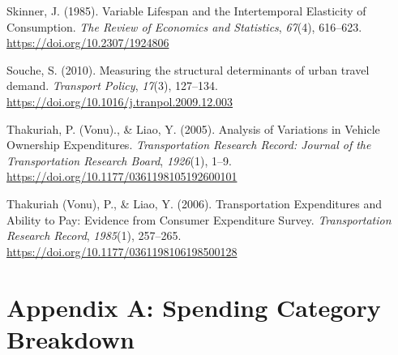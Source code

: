 \documentclass[
]{agujournal2019}
\newlength{\cslhangindent}
\newenvironment{CSLReferences}[2] %
 {\begin{list}{}{%
  \setlength{\itemindent}{0pt}
  \setlength{\leftmargin}{0pt}
  \setlength{\parsep}{0pt}
  \ifodd #1
   \setlength{\leftmargin}{\cslhangindent}
   \setlength{\itemindent}{-1\cslhangindent}
  \fi
  \setlength{\itemsep}{#2\baselineskip}}}
 {\end{list}}
\begin{document}
\begin{CSLReferences}{1}{0}
Skinner, J. (1985). Variable {Lifespan} and the {Intertemporal}
{Elasticity} of {Consumption}. \emph{The Review of Economics and
Statistics}, \emph{67}(4), 616--623.
\url{https://doi.org/10.2307/1924806}

Souche, S. (2010). Measuring the structural determinants of urban travel
demand. \emph{Transport Policy}, \emph{17}(3), 127--134.
\url{https://doi.org/10.1016/j.tranpol.2009.12.003}

Thakuriah, P. (Vonu)., \& Liao, Y. (2005). Analysis of {Variations} in
{Vehicle} {Ownership} {Expenditures}. \emph{Transportation Research
Record: Journal of the Transportation Research Board}, \emph{1926}(1),
1--9. \url{https://doi.org/10.1177/0361198105192600101}

Thakuriah (Vonu), P., \& Liao, Y. (2006). Transportation {Expenditures}
and {Ability} to {Pay}: {Evidence} from {Consumer} {Expenditure}
{Survey}. \emph{Transportation Research Record}, \emph{1985}(1),
257--265. \url{https://doi.org/10.1177/0361198106198500128}

\end{CSLReferences}

\section{Appendix A: Spending Category Breakdown}\label{sec-appendix-a}
\end{document}
